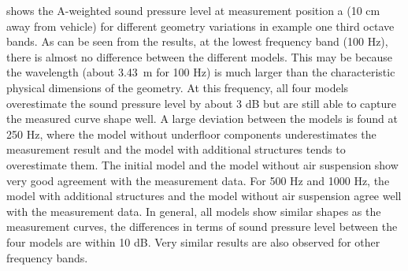\noindent{} shows the A-weighted sound pressure level at measurement position a (10 cm away from vehicle) for different geometry variations in example one third octave bands. As can be seen from the results, at the lowest frequency band (100 Hz), there is almost no difference between the different models. This may be because the wavelength (about \SI{3.43}{\meter} for 100 Hz) is much larger than the characteristic physical dimensions of the geometry. At this frequency, all four models overestimate the sound pressure level by about 3 dB but are still able to capture the measured curve shape well. A large deviation between the models is found at 250 Hz, where the model without underfloor components underestimates the measurement result and the model with additional structures tends to overestimate them. The initial model and the model without air suspension show very good agreement with the measurement data. For 500 Hz and 1000 Hz, the model with additional structures and the model without air suspension agree well with the measurement data. In general, all models show similar shapes as the measurement curves, the differences in terms of sound pressure level between the four models are within 10 dB. Very similar results are also observed for other frequency bands.

